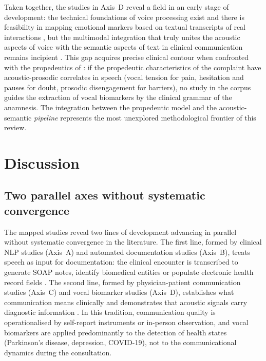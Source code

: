 \documentclass[review,12pt]{elsarticle}
\begin{document}
Taken together, the studies in Axis~D reveal a field in an early stage of
development: the technical foundations of voice processing exist
\citep{Fagherazzi2021} and there is feasibility in mapping emotional markers
based on textual transcripts of real interactions \citep{Imel2022}, but the
multimodal integration that truly unites the acoustic aspects of voice with
the semantic aspects of text in clinical communication remains incipient
\citep{Albert2024}. This gap acquires precise clinical contour when confronted
with the propedeutics of \citet{Porto2019}: if the propedeutic characteristics
of the complaint have acoustic-prosodic correlates in speech (vocal tension for
pain, hesitation and pauses for doubt, prosodic disengagement for barriers),
no study in the corpus guides the extraction of vocal biomarkers by the
clinical grammar of the anamnesis. The integration between the propedeutic
model and the acoustic-semantic \textit{pipeline} represents the most
unexplored methodological frontier of this review.

\section{Discussion}
\label{sec:discussao}


\subsection*{Two parallel axes without systematic convergence}

The mapped studies reveal two lines of development advancing in parallel
without systematic convergence in the literature.
The first line, formed by clinical NLP studies (Axis~A) and automated
documentation studies (Axis~B), treats speech as input for documentation:
the clinical encounter is transcribed to generate SOAP notes, identify
biomedical entities or populate electronic health record fields
\citep{Bazoge2023,vanBuchem2021,Falcetta2023,Ng2025}.
The second line, formed by physician-patient communication studies (Axis~C)
and vocal biomarker studies (Axis~D), establishes what communication means
clinically and demonstrates that acoustic signals carry diagnostic information
\citep{Kelley2014,Fagherazzi2021,Albert2024}.
In this tradition, communication quality is operationalised by self-report
instruments or in-person observation, and vocal biomarkers are applied
predominantly to the detection of health states (Parkinson's disease,
depression, COVID-19), not to the communicational dynamics during the
consultation.
\end{document}
